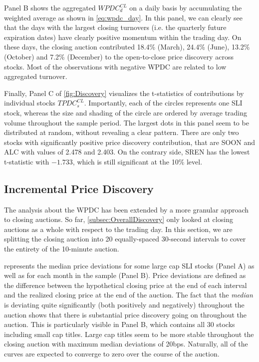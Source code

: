 \documentclass[11pt,a4paper, notitlepage]{article}
\begin{document}
	Panel B shows the aggregated $WPDC^{CL}_d$ on a daily basis by accumulating the weighted average as shown in \cref{eq:wpdc_day}. In this panel, we can clearly see that the days with the largest closing turnovers (i.e. the quarterly future expiration dates) have clearly positive momentum within the trading day. On these days, the closing auction contributed 18.4\% (March), 24.4\% (June), 13.2\% (October) and 7.2\% (December) to the open-to-close price discovery across stocks. Most of the observations with negative WPDC are related to low aggregated turnover.
	
	Finally, Panel C of \cref{fig:Discovery} visualizes the t-statistics of contributions by individual stocks $TPDC^{CL}_s$. Importantly, each of the circles represents one SLI stock, whereas the size and shading of the circle are ordered by average trading volume throughout the sample period. The largest dots in this panel seem to be distributed at random, without revealing a clear pattern. There are only two stocks with significantly positive price discovery contribution, that are SOON and ALC with values of 2.478 and 2.403. On the contrary side, SREN has the lowest t-statistic with $-1.733$, which is still significant at the 10\% level.
	
	\subsection{Incremental Price Discovery} \label{subsec:intervals}
	
	The analysis about the WPDC has been extended by a more granular approach to closing auctions. So far, \cref{subsec:OverallDiscovery} only looked at closing auctions as a whole with respect to the trading day. In this section, we are splitting the closing auction into 20 equally-spaced 30-second intervals to cover the entirety of the 10-minute auction.
	
	 represents the median price deviations for some large cap SLI stocks (Panel A) as well as for each month in the sample (Panel B). Price deviations are defined as the difference between the hypothetical closing price at the end of each interval and the realized closing price at the end of the auction. The fact that the \emph{median} is deviating quite significantly (both positively and negatively) throughout the auction shows that there is substantial price discovery going on throughout the auction. This is particularly visible in Panel B, which contains all 30 stocks including small cap titles. Large cap titles seem to be more stable throughout the closing auction with maximum median deviations of 20bps. Naturally, all of the curves are expected to converge to zero over the course of the auction.
	
\end{document}
